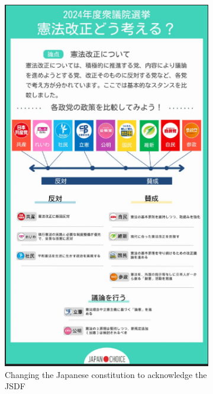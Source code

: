 \documentclass[final,5p,times,twocolumn,authoryear]{elsarticle}
\begin{document}
\begin{figure}[ht]
\begin{subfigure}[t]{0.22\textwidth}
        \includegraphics[width=\linewidth]{figs/mielka/jsdfconsitution.png}
        \caption{Changing the Japanese constitution to acknowledge the JSDF}
        \label{fig:jsdfconsitution}
    \end{subfigure}\hfill
    \begin{subfigure}[t]{0.22\textwidth}
        \centering

\end{subfigure}
\end{figure}
\end{document}
